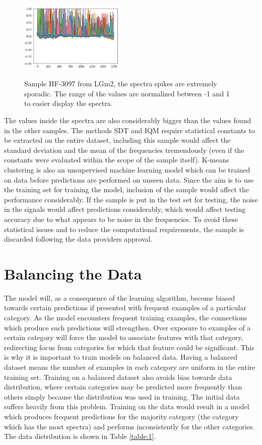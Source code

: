 \begin{figure}[H]

    \centering
{\includegraphics[width=5cm]{images/HF_3097.JPG} }
\caption{Sample HF-3097 from LGm2, the spectra spikes are extremely sporadic. The range of the values are normalized between -1 and 1 to easier display the spectra.\label{fig:HF3097}}%

\end{figure}

The values inside the spectra are also considerably bigger than the values found in the other samples. The methods SDT and IQM require statistical constants to be extracted on the entire dataset, including this sample would affect the standard deviation and the mean of the frequencies tremendously (even if the constants were evaluated within the scope of the sample itself). K-means clustering is also an unsupervised machine learning model which can be trained on data before predictions are performed on unseen data. Since the aim is to use the training set for training the model, inclusion of the sample would affect the performance considerably. If the sample is put in the test set for testing, the noise in the signals would affect predictions considerably, which would affect testing accuracy due to what appears to be noise in the frequencies. To avoid these statistical issues and to reduce the computational requirements, the sample is discarded following the data providers approval.


\section{Balancing the Data}
The model will, as a consequence of the learning algorithm, become biased towards certain predictions if presented with frequent examples of a particular category. As the model encounters frequent training examples, the connections which produce such predictions will strengthen. Over exposure to examples of a certain category will force the model to associate features with that category, redirecting focus from categories for which that feature could be significant. This is why it is important to train models on balanced data. Having a balanced dataset means the number of examples in each category are uniform in the entire training set. Training on a balanced dataset also avoids bias towards data distribution, where certain categories may be predicted more frequently than others simply because the distribution was used in training. The initial data suffers heavily from this problem. Training on the data would result in a model which produces frequent predictions for the majority category (the category which has the most spectra) and performs inconsistently for the other categories. The data distribution is shown in Table \ref{table:1}.

